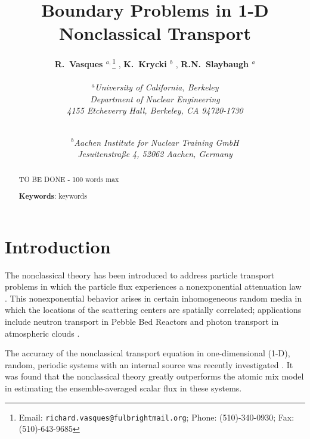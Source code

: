 \documentclass[12pt]{article}
\newcommand{\Keywords}[1]{\vspace{12pt}\par\noindent
{\small{\bf Keywords\/}: #1}}
\begin{document}
\title{Boundary Problems in 1-D Nonclassical Transport}

\author{{\bf R.\ Vasques $^{a,}$}\footnote{Email: \texttt{richard.vasques@fulbrightmail.org}; Phone: (510)-340-0930; Fax: (510)-643-9685} , {\bf K.\ Krycki $^{b}$} , {\bf R.N.\ Slaybaugh $^{a}$}\\ \\
\em {\bf $^a$}University of California, Berkeley\\
\em Department of Nuclear Engineering\\
\em 4155 Etcheverry Hall, Berkeley, CA 94720-1730\\
\and \\
\em {\bf $^b$}Aachen Institute for Nuclear Training GmbH \\
\em Jesuitenstraße 4, 52062 Aachen, Germany}
\date{}

\rhead{\runtitle}
\lhead{}
\pagestyle{fancy}
\makeatletter
\let\runtitle\@title
\makeatother

\maketitle

\begin{abstract}

TO BE DONE - 100 words max

\Keywords{keywords}
\end{abstract}

\doublespacing


\section{Introduction}\label{sec1}

The nonclassical theory has been introduced to address particle transport problems in which the particle flux experiences a nonexponential
attenuation law \citep{lar07,fra10,larvas11,vaslar14a}. This nonexponential behavior arises in certain inhomogeneous random media in which the locations of the scattering centers are spatially correlated; applications include neutron transport in Pebble Bed Reactors \citep{vaslar09,vas13,vaslar14b} and photon transport in atmospheric clouds \citep{kry13}.

The accuracy of the nonclassical transport equation in one-dimensional (1-D), random, periodic systems with an internal source was recently investigated \citep{mc15, nse16}.
It was found that the nonclassical theory greatly outperforms the atomic mix model in estimating the ensemble-averaged scalar flux in these systems.
\end{document}
